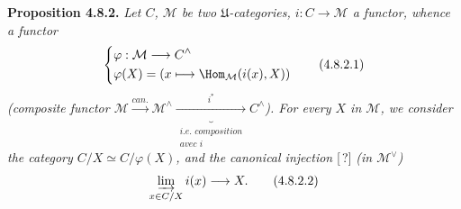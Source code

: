 \textbf{Proposition 4.8.2.} \textit{Let $C$, $\mathcal{M}$ be two $\mathfrak{U}$-categories, $i : C \longrightarrow \mathcal{M}$ a functor, whence a functor}
\[ \left\{\begin{aligned}
&\varphi : \mathcal{M} \longrightarrow C^{\wedge}\\
&\varphi(X) = (x \longmapsto \Hom_{\mathcal{M}}(i(x),X))
\end{aligned}\right. \tag*{(4.8.2.1)} \]
\textit{(composite functor $\mathcal{M} \xrightarrow{\textit{can.}} \mathcal{M}^{\wedge} \underbrace{\xrightarrow{i^*}}_{\substack{\textit{i.e. composition}\\ \textit{avec } i}} C^{\wedge}$). For every $X$ in $\mathcal{M}$, we consider the category $C/X \simeq C/\varphi(X)$, and the canonical injection} [\,?] \textit{(in $\mathcal{M}^{\vee}$)}
\[ \varinjlim_{x\in C/X} i(x) \longrightarrow X . \tag*{(4.8.2.2)} \]
